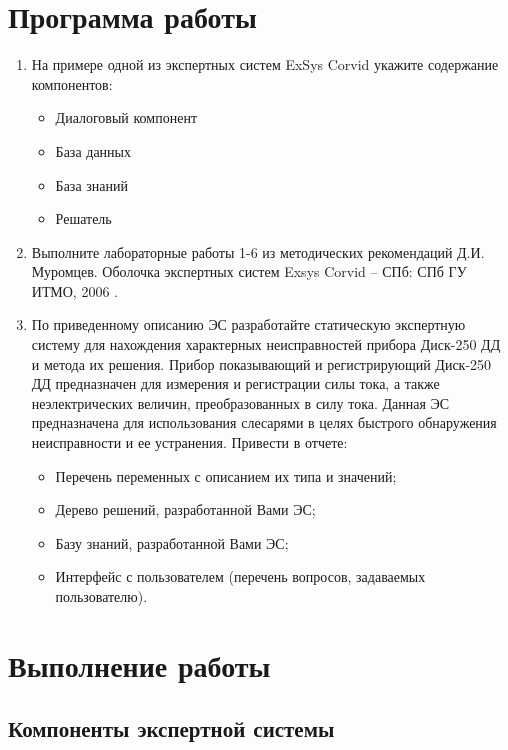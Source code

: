 





\tableofcontents
\newpage

\section{Программа работы}

\begin{enumerate}
	\item На примере одной из экспертных систем ExSys Corvid\cite{corvid-demos} укажите содержание компонентов:
	\begin{itemize}
		\item Диалоговый компонент
		\item База данных
		\item База знаний
		\item Решатель
	\end{itemize}
	\item Выполните лабораторные работы 1-6 из методических рекомендаций Д.И. Муромцев. Оболочка экспертных систем Exsys Corvid – СПб: СПб ГУ ИТМО, 2006 \cite{labs}.
	\item По приведенному описанию ЭС разработайте статическую экспертную систему для нахождения характерных неисправностей прибора Диск-250 ДД и метода их решения. Прибор показывающий и регистрирующий Диск-250 ДД предназначен для измерения и регистрации силы тока, а также неэлектрических величин, преобразованных в силу тока. Данная ЭС предназначена для использования слесарями в целях быстрого обнаружения неисправности и ее устранения. Привести в отчете:
	\begin{itemize}
		\item Перечень переменных с описанием их типа и значений;
		\item Дерево решений, разработанной Вами ЭС;
		\item Базу знаний, разработанной Вами ЭС;
		\item Интерфейс с пользователем (перечень вопросов, задаваемых пользователю).
	\end{itemize}
\end{enumerate}

\newpage

\section{Выполнение работы}

\subsection{Компоненты экспертной системы}

